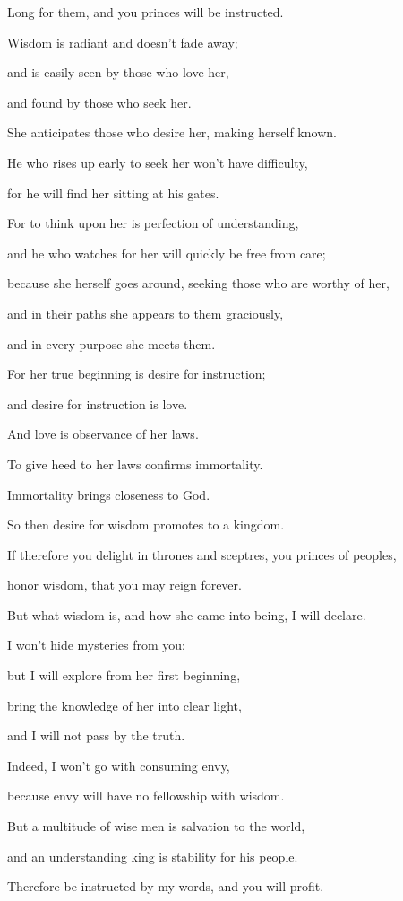 {\par }{\QB Long for them, and you princes will be instructed.
\par }{\BB \par }{\Q {}Wisdom is radiant and doesn’t fade away;
\par }{\QB and is easily seen by those who love her,
\par }{\QB and found by those who seek her.
\par }{\Q {}She anticipates those who desire her, making herself known.
\par }{\Q {}He who rises up early to seek her won’t have difficulty,
\par }{\QB for he will find her sitting at his gates.
\par }{\QB {}For to think upon her is perfection of understanding,
\par }{\QB and he who watches for her will quickly be free from care;
\par }{\Q {}because she herself goes around, seeking those who are worthy of her,
\par }{\QB and in their paths she appears to them graciously,
\par }{\QB and in every purpose she meets them.
\par }{\Q {}For her true beginning is desire for instruction;
\par }{\QB and desire for instruction is love.
\par }{\Q {}And love is observance of her laws.
\par }{\QB To give heed to her laws confirms immortality.
\par }{\Q {}Immortality brings closeness to God.
\par }{\QB {}So then desire for wisdom promotes to a kingdom.
\par }{\Q {}If therefore you delight in thrones and sceptres, you princes of peoples,
\par }{\QB honor wisdom, that you may reign forever.
\par }{\Q {}But what wisdom is, and how she came into being, I will declare.
\par }{\QB I won’t hide mysteries from you;
\par }{\QB but I will explore from her first beginning,
\par }{\QB bring the knowledge of her into clear light,
\par }{\QB and I will not pass by the truth.
\par }{\Q {}Indeed, I won’t go with consuming envy,
\par }{\QB because envy will have no fellowship with wisdom.
\par }{\Q {}But a multitude of wise men is salvation to the world,
\par }{\QB and an understanding king is stability for his people.
\par }{\Q {}Therefore be instructed by my words, and you will profit.

}

